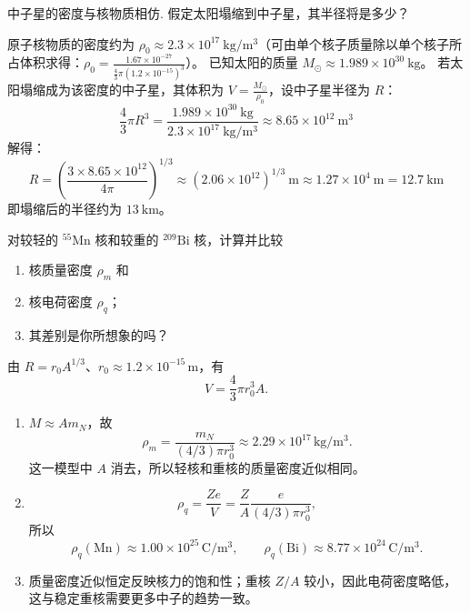 \begin{exercise}\label{ex:29.4}
中子星的密度与核物质相仿. 假定太阳塌缩到中子星，其半径将是多少？
\end{exercise}
\begin{solution}
原子核物质的密度约为 $\rho_0 \approx 2.3 \times 10^{17} \ \mathrm{kg/m^3}$（可由单个核子质量除以单个核子所占体积求得：$\rho_0 = \frac{1.67 \times 10^{-27}}{\frac{4}{3}\pi (1.2 \times 10^{-15})^3}$）。
已知太阳的质量 $M_\odot \approx 1.989 \times 10^{30} \ \mathrm{kg}$。
若太阳塌缩成为该密度的中子星，其体积为 $V = \frac{M_\odot}{\rho_0}$，设中子星半径为 $R$：
$$ \frac{4}{3}\pi R^3 = \frac{1.989 \times 10^{30} \ \mathrm{kg}}{2.3 \times 10^{17} \ \mathrm{kg/m^3}} \approx 8.65 \times 10^{12} \ \mathrm{m^3} $$
解得：
$$ R = \left( \frac{3 \times 8.65 \times 10^{12}}{4\pi} \right)^{1/3} \approx (2.06 \times 10^{12})^{1/3} \ \mathrm{m} \approx 1.27 \times 10^4 \ \mathrm{m} = 12.7 \ \mathrm{km} $$
即塌缩后的半径约为 $13 \ \mathrm{km}$。
\end{solution}

\begin{exercise}\label{ex:29.5}
对较轻的 $^{55}\mathrm{Mn}$ 核和较重的 $^{209}\mathrm{Bi}$ 核，计算并比较
\begin{enumerate}
  \item[(a)] 核质量密度 $\rho_m$ 和
  \item[(b)] 核电荷密度 $\rho_q$；
  \item[(c)] 其差别是你所想象的吗？
\end{enumerate}
\end{exercise}
\begin{solution}
由 $R=r_0A^{1/3}$、$r_0\approx1.2\times10^{-15}\,\mathrm m$，有
$$ V=\frac43\pi r_0^3A. $$
\begin{enumerate}
\item[(a)] $M\approx Am_N$，故
$$
\boxed{\rho_m=\frac{m_N}{(4/3)\pi r_0^3}\approx2.29\times10^{17}\,\mathrm{kg/m^3}}.
$$
这一模型中 $A$ 消去，所以轻核和重核的质量密度近似相同。
\item[(b)]
$$
\rho_q=\frac{Ze}{V}=\frac{Z}{A}\frac{e}{(4/3)\pi r_0^3},
$$
所以
$$
\boxed{\rho_q(\mathrm{Mn})\approx1.00\times10^{25}\,\mathrm{C/m^3}},\qquad
\boxed{\rho_q(\mathrm{Bi})\approx8.77\times10^{24}\,\mathrm{C/m^3}}.
$$
\item[(c)] 质量密度近似恒定反映核力的饱和性；重核 $Z/A$ 较小，因此电荷密度略低，这与稳定重核需要更多中子的趋势一致。
\end{enumerate}
\end{solution}

